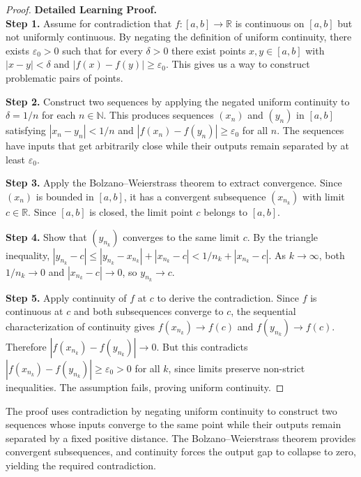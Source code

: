 \begin{proof}
\textbf{Detailed Learning Proof.}~\\

\textbf{Step 1.} Assume for contradiction that $f \colon [a,b] \to \mathbb{R}$ is continuous on $[a,b]$ but not uniformly continuous. By negating the definition of uniform continuity, there exists $\varepsilon_{0} > 0$ such that for every $\delta > 0$ there exist points $x, y \in [a,b]$ with $|x - y| < \delta$ and $|f(x) - f(y)| \geq \varepsilon_{0}$. This gives us a way to construct problematic pairs of points.

\textbf{Step 2.} Construct two sequences by applying the negated uniform continuity to $\delta = 1/n$ for each $n \in \mathbb{N}$. This produces sequences $(x_{n})$ and $(y_{n})$ in $[a,b]$ satisfying $|x_{n} - y_{n}| < 1/n$ and $|f(x_{n}) - f(y_{n})| \geq \varepsilon_{0}$ for all $n$. The sequences have inputs that get arbitrarily close while their outputs remain separated by at least $\varepsilon_{0}$.

\textbf{Step 3.} Apply the Bolzano--Weierstrass theorem to extract convergence. Since $(x_{n})$ is bounded in $[a,b]$, it has a convergent subsequence $(x_{n_{k}})$ with limit $c \in \mathbb{R}$. Since $[a,b]$ is closed, the limit point $c$ belongs to $[a,b]$.

\textbf{Step 4.} Show that $(y_{n_{k}})$ converges to the same limit $c$. By the triangle inequality, $|y_{n_{k}} - c| \leq |y_{n_{k}} - x_{n_{k}}| + |x_{n_{k}} - c| < 1/n_{k} + |x_{n_{k}} - c|$. As $k \to \infty$, both $1/n_{k} \to 0$ and $|x_{n_{k}} - c| \to 0$, so $y_{n_{k}} \to c$.

\textbf{Step 5.} Apply continuity of $f$ at $c$ to derive the contradiction. Since $f$ is continuous at $c$ and both subsequences converge to $c$, the sequential characterization of continuity gives $f(x_{n_{k}}) \to f(c)$ and $f(y_{n_{k}}) \to f(c)$. Therefore $|f(x_{n_{k}}) - f(y_{n_{k}})| \to 0$. But this contradicts $|f(x_{n_{k}}) - f(y_{n_{k}})| \geq \varepsilon_{0} > 0$ for all $k$, since limits preserve non-strict inequalities. The assumption fails, proving uniform continuity.
\end{proof}

\begin{remark*}
The proof uses contradiction by negating uniform continuity to construct two sequences whose inputs converge to the same point while their outputs remain separated by a fixed positive distance. The Bolzano--Weierstrass theorem provides convergent subsequences, and continuity forces the output gap to collapse to zero, yielding the required contradiction.
\end{remark*}

